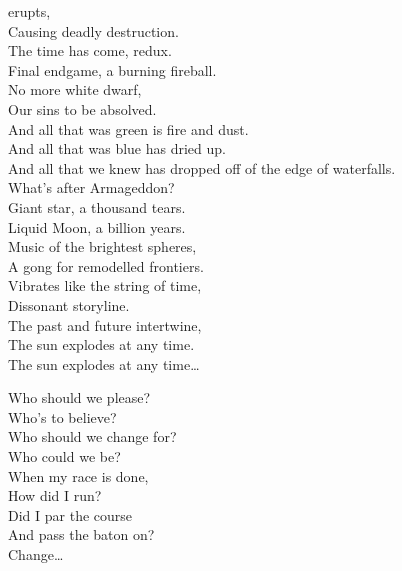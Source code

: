  erupts, \\
Causing deadly destruction. \\
The time has come, redux. \\
Final endgame, a burning fireball. \\
No more white dwarf, \\
Our sins to be absolved. \\

And all that was green is fire and dust. \\
And all that was blue has dried up. \\
And all that we knew has dropped off of the edge of waterfalls. \\
What's after Armageddon? \\

Giant star, a thousand tears. \\
Liquid Moon, a billion years. \\
Music of the brightest spheres, \\
A gong for remodelled frontiers. \\

Vibrates like the string of time, \\
Dissonant storyline. \\
The past and future intertwine, \\
The sun explodes at any time. \\

The sun explodes at any time… \\





Who should we please? \\
Who's to believe? \\
Who should we change for? \\
Who could we be? \\

When my race is done, \\
How did I run? \\
Did I par the course \\
And pass the baton on? \\

Change… \\
